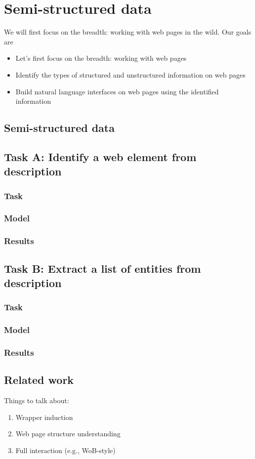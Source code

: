 \chapter{Semi-structured data}\label{chp:semi}

We will first focus on the breadth:
working with web pages in the wild.
Our goals are
\begin{itemize}
\item Let's first focus on the breadth: working with web pages
\item Identify the types of structured and unstructured information on web pages
\item Build natural language interfaces on web pages using the identified information
\end{itemize}

\section{Semi-structured data}

\section{Task A: Identify a web element from description}
\subsection{Task}
\subsection{Model}
\subsection{Results}

\section{Task B: Extract a list of entities from description}
\subsection{Task}
\subsection{Model}
\subsection{Results}

\section{Related work}

Things to talk about:
\begin{enumerate}
\item Wrapper induction
\item Web page structure understanding
\item Full interaction (e.g., WoB-style)
\end{enumerate}